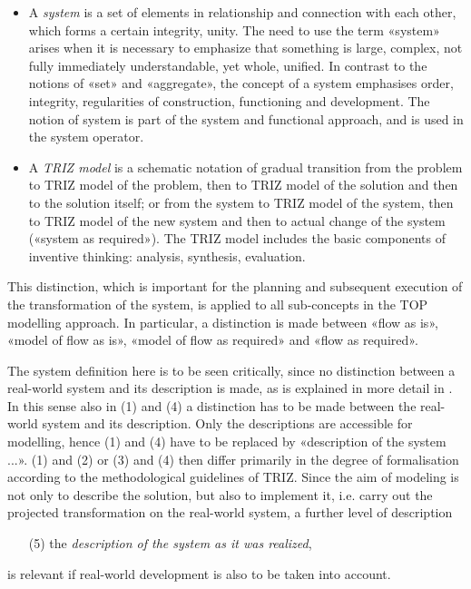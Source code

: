\documentclass[11pt,a4paper]{article}
\begin{document}
\begin{itemize}[noitemsep]
\item A \emph{system} is a set of elements in relationship and connection with
  each other, which forms a certain integrity, unity. The need to use the term
  «system» arises when it is necessary to emphasize that something is large,
  complex, not fully immediately understandable, yet whole, unified. In
  contrast to the notions of «set» and «aggregate», the concept of a system
  emphasises order, integrity, regularities of construction, functioning and
  development. The notion of system is part of the system and functional
  approach, and is used in the system operator.
\item A \emph{TRIZ model} is a schematic notation of gradual transition
  from the problem to TRIZ model of the problem, then to TRIZ model of the
  solution and then to the solution itself; or from the system to TRIZ model
  of the system, then to TRIZ model of the new system and then to actual
  change of the system («system as required»). The TRIZ model includes the
  basic components of inventive thinking: analysis, synthesis, evaluation.
\end{itemize}
This distinction, which is important for the planning and subsequent execution
of the transformation of the system, is applied to all sub-concepts in the TOP
modelling approach.  In particular, a distinction is made between «flow as
is», «model of flow as is», «model of flow as required» and «flow as
required».

The system definition here is to be seen critically, since no distinction
between a real-world system and its description is made, as is explained in
more detail in \cite{Graebe2020}.  In this sense also in (1) and (4) a
distinction has to be made between the real-world system and its description.
Only the descriptions are accessible for modelling, hence (1) and (4) have to
be replaced by «description of the system ...». (1) and (2) or (3) and (4)
then differ primarily in the degree of formalisation according to the
methodological guidelines of TRIZ.  Since the aim of modeling is not only to
describe the solution, but also to implement it, i.e. carry out the projected
transformation on the real-world system, a further level of description
\begin{itemize}
\item [(5)] the \emph{description of the system as it was realized},
\end{itemize}
is relevant if real-world development is also to be taken into account.
\end{document}
